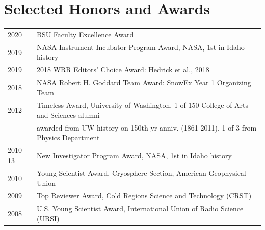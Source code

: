 \documentclass[11pt]{article}
\begin{document}
\section*{Selected Honors and Awards}
\begin{tabular}{ll}
2020 & BSU Faculty Excellence Award \\
2019 & NASA Instrument Incubator Program Award, NASA, 1st in Idaho history \\
2019 & 2018 WRR Editors' Choice Award: Hedrick et al., 2018 \\
2018 & NASA Robert H. Goddard Team Award: SnowEx Year 1 Organizing Team \\
2012 & Timeless Award, University of Washington, 1 of 150 College of Arts and Sciences alumni  \\
& awarded from UW history on 150th yr anniv. (1861-2011), 1 of 3 from Physics Department \\
2010-13 & New Investigator Program Award, NASA, 1st in Idaho history \\
2010 & Young Scientist Award, Cryosphere Section, American Geophysical Union \\
2009 & Top Reviewer Award, Cold Regions Science and Technology (CRST) \\
2008 & U.S. Young Scientist Award, International Union of Radio Science (URSI) \\

\end{tabular}
\end{document}
